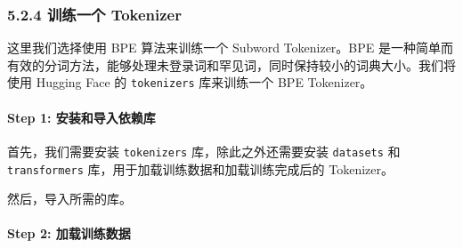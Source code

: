 \documentclass[12pt,a4paper]{book}
\begin{document}
\subsubsection{5.2.4 训练一个
Tokenizer}\label{ux8badux7ec3ux4e00ux4e2a-tokenizer}

这里我们选择使用 BPE 算法来训练一个 Subword Tokenizer。BPE
是一种简单而有效的分词方法，能够处理未登录词和罕见词，同时保持较小的词典大小。我们将使用
Hugging Face 的 \texttt{tokenizers} 库来训练一个 BPE Tokenizer。

\paragraph{Step 1:
安装和导入依赖库}\label{step-1-ux5b89ux88c5ux548cux5bfcux5165ux4f9dux8d56ux5e93}

首先，我们需要安装 \texttt{tokenizers} 库，除此之外还需要安装
\texttt{datasets} 和 \texttt{transformers}
库，用于加载训练数据和加载训练完成后的 Tokenizer。

\begin{Shaded}
\begin{Highlighting}[]
\end{Highlighting}
\end{Shaded}

然后，导入所需的库。

\begin{Shaded}
\begin{Highlighting}[]
\NormalTok{ (}
\NormalTok{)}
\end{Highlighting}
\end{Shaded}

\paragraph{Step 2:
加载训练数据}\label{step-2-ux52a0ux8f7dux8badux7ec3ux6570ux636e}
\end{document}
